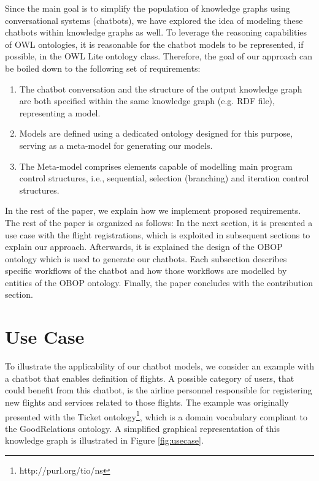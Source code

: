 \documentclass[runningheads]{llncs}
\begin{document}
Since the main goal is to simplify the population of knowledge graphs using conversational systems (chatbots), we have explored the idea of modeling these chatbots within knowledge graphs as well. To leverage the reasoning capabilities of OWL ontologies, it is reasonable for the chatbot models to be represented, if possible, in the OWL Lite ontology class. Therefore, the goal of our approach can be boiled down to the following set of requirements:
\begin{enumerate}
\item
  The chatbot conversation and the structure of the output knowledge graph are both specified within the same knowledge graph (e.g. RDF file), representing a model.
\item
  Models are defined using a dedicated ontology designed for this purpose, serving as a meta-model for generating our models.
\item
The Meta-model comprises elements capable of modelling main program control structures, i.e., sequential, selection (branching) and iteration control structures. 
\end{enumerate}

In the rest of the paper, we explain how we implement proposed requirements.
The rest of the paper is organized as follows: In the next section, it is presented a use case with the flight registrations, which is exploited in subsequent sections to explain our approach. Afterwards, it is explained the design of the OBOP ontology which is used to generate our chatbots. Each subsection describes specific workflows of the chatbot and how those workflows are modelled by entities of the OBOP ontology. Finally, the paper concludes with the contribution section.

\section{Use Case}
To illustrate the applicability of our chatbot models, we consider an example with a chatbot that enables definition of flights. A possible category of users, that could benefit from this chatbot, is the airline personnel responsible for registering new flights and services related to those flights. The example was originally presented with the Ticket ontology\footnote{\label{Ticket Ontology}http://purl.org/tio/ns}, which is a domain vocabulary compliant to the GoodRelations \cite{hepp2008goodrelations} ontology. A simplified graphical representation of this knowledge graph is illustrated in Figure \ref{fig:usecase}.
\end{document}
